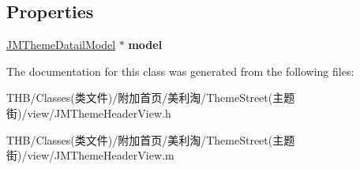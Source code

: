 \subsection*{Properties}
\begin{DoxyCompactItemize}
\item 
\mbox{\label{interface_j_m_theme_header_view_a7d3e9f7774f114c241bd1cea33ab5ff6}} 
\mbox{\hyperlink{interface_j_m_theme_datail_model}{J\+M\+Theme\+Datail\+Model}} $\ast$ {\bfseries model}
\end{DoxyCompactItemize}


The documentation for this class was generated from the following files\+:\begin{DoxyCompactItemize}
\item 
T\+H\+B/\+Classes(类文件)/附加首页/美利淘/\+Theme\+Street(主题街)/view/J\+M\+Theme\+Header\+View.\+h\item 
T\+H\+B/\+Classes(类文件)/附加首页/美利淘/\+Theme\+Street(主题街)/view/J\+M\+Theme\+Header\+View.\+m\end{DoxyCompactItemize}
